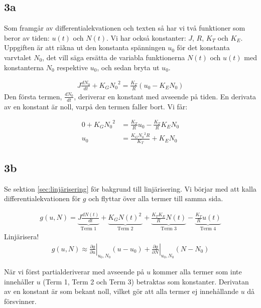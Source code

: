 \documentclass[a4paper]{article}
\begin{document}
\subsection{3a}
Som framgår av differentialekvationen och texten så har vi två funktioner som beror av tiden: $u(t)$ och $N(t)$. Vi har också konstanter: $J$, $R$, $K_T$ och $K_E$. Uppgiften är att räkna ut den konstanta spänningen $u_0$ för det konstanta varvtalet $N_0$, det vill säga ersätta de variabla funktionerna $N(t)$ och $u(t)$ med konstanterna $N_0$ respektive $u_0$, och sedan bryta ut $u_0$.

\begin{align*}
  J \frac{dN_0}{dt} + K_G{N_0}^2 = \frac{K_T}{R}(u_0 - K_EN_0)
\end{align*}
%
Den första termen, $\frac{dN_0}{dt}$, deriverar en konstant med avseende på tiden. En derivata av en konstant är noll, varpå den termen faller bort. Vi får:

\begin{align*}
  0 + K_G{N_0}^2 &= \frac{K_T}{R}u_0 - \frac{K_T}{R}K_EN_0\\
  u_0 &= \frac{K_G{N_0}^2R}{K_T} + K_EN_0
\end{align*}
%


\subsection{3b}
Se sektion \ref{sec:linjärisering} för bakgrund till linjärisering. Vi börjar med att kalla differentialekvationen för $g$ och flyttar över alla termer till samma sida.

\begin{align*}
  g(u, N) = \underbrace{J \frac{dN(t)}{dt}}_{\text{Term 1}} + \underbrace{K_G{N(t)}^2\frac{ }{ }}_{\text{Term 2}} + \underbrace{\frac{K_T K_E}{R} N(t)}_{\text{Term 3}} - \underbrace{\frac{K_T}{R}u(t)}_{\text{Term 4}}
\end{align*}
Linjärisera!
\begin{align*}
  g(u, N) \approx \left. \frac{\partial g}{\partial u}\right|_{u_0, N_0}(u - u_0) + \left. \frac{\partial g}{\partial N}\right|_{u_0, N_0}(N - N_0)
\end{align*}

När vi först partialderiverar med avseende på $u$ kommer alla termer som inte innehåller $u$ (Term 1, Term 2 och Term 3) betraktas som konstanter. Derivatan av en konstant är som bekant noll, vilket gör att alla termer ej innehållande $u$ då försvinner.
\end{document}
